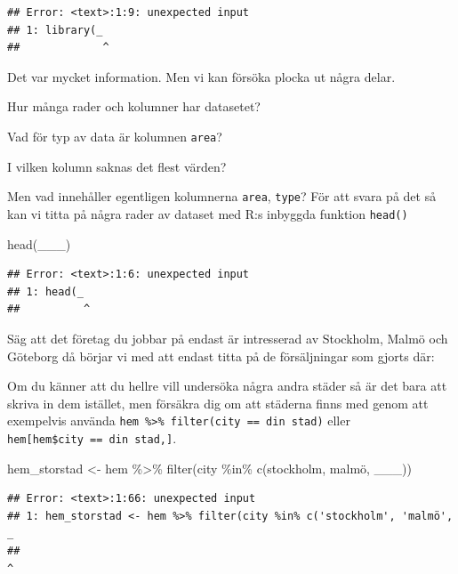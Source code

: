 \documentclass[
]{book}
\newenvironment{Shaded}{\begin{snugshade}}{\end{snugshade}}
\newcommand{\FunctionTok}[1]{\textcolor[rgb]{0.00,0.00,0.00}{#1}}
\newcommand{\NormalTok}[1]{#1}
\newcommand{\OtherTok}[1]{\textcolor[rgb]{0.56,0.35,0.01}{#1}}
\newcommand{\SpecialCharTok}[1]{\textcolor[rgb]{0.00,0.00,0.00}{#1}}
\newcommand{\StringTok}[1]{\textcolor[rgb]{0.31,0.60,0.02}{#1}}
\begin{document}
\begin{verbatim}
## Error: <text>:1:9: unexpected input
## 1: library(_
##             ^
\end{verbatim}

Det var mycket information. Men vi kan försöka plocka ut några delar.

Hur många rader och kolumner har datasetet?

Vad för typ av data är kolumnen \texttt{area}?

I vilken kolumn saknas det flest värden?

Men vad innehåller egentligen kolumnerna \texttt{area}, \texttt{type}? För att svara på det så kan vi titta på några rader av dataset med R:s inbyggda funktion \texttt{head()}

\begin{Shaded}
\begin{Highlighting}[]
\FunctionTok{head}\NormalTok{(\_\_\_)}
\end{Highlighting}
\end{Shaded}

\begin{verbatim}
## Error: <text>:1:6: unexpected input
## 1: head(_
##          ^
\end{verbatim}

Säg att det företag du jobbar på endast är intresserad av Stockholm, Malmö och Göteborg då börjar vi med att endast titta på de försäljningar som gjorts där:

Om du känner att du hellre vill undersöka några andra städer så är det bara att skriva in dem istället, men försäkra dig om att städerna finns med genom att exempelvis använda \texttt{hem\ \%\textgreater{}\%\ filter(city\ ==\ \textquotesingle{}din\ stad\textquotesingle{})} eller \texttt{hem{[}hem\$city\ ==\ \textquotesingle{}din\ stad\textquotesingle{},{]}}.

\begin{Shaded}
\begin{Highlighting}[]
\NormalTok{hem\_storstad }\OtherTok{\textless{}{-}}\NormalTok{ hem }\SpecialCharTok{\%\textgreater{}\%} \FunctionTok{filter}\NormalTok{(city }\SpecialCharTok{\%in\%} \FunctionTok{c}\NormalTok{(}\StringTok{\textquotesingle{}stockholm\textquotesingle{}}\NormalTok{, }\StringTok{\textquotesingle{}malmö\textquotesingle{}}\NormalTok{, \_\_\_))}
\end{Highlighting}
\end{Shaded}

\begin{verbatim}
## Error: <text>:1:66: unexpected input
## 1: hem_storstad <- hem %>% filter(city %in% c('stockholm', 'malmö', _
##                                                                      ^
\end{verbatim}
\end{document}
